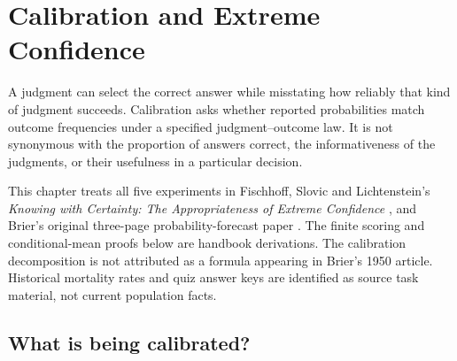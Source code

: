 \chapter{Calibration and Extreme Confidence}
\label{sec:p19-calibration-extreme-confidence}

A judgment can select the correct answer while misstating how reliably that
kind of judgment succeeds. Calibration asks whether reported probabilities
match outcome frequencies under a specified judgment--outcome law. It is
not synonymous with the proportion of answers correct, the informativeness
of the judgments, or their usefulness in a particular decision.

This chapter treats all five experiments in Fischhoff, Slovic and
Lichtenstein's \emph{Knowing with Certainty: The Appropriateness of Extreme
Confidence} \cite{FischhoffSlovicLichtenstein1977Certainty}, and Brier's
original three-page probability-forecast paper \cite{Brier1950Verification}.
The finite scoring and conditional-mean proofs below are handbook
derivations. The calibration decomposition is not attributed as a formula
appearing in Brier's 1950 article. Historical mortality rates and quiz answer
keys are identified as source task material, not current population facts.

\section{What is being calibrated?}
\label{sec:p19-calibration-law}


